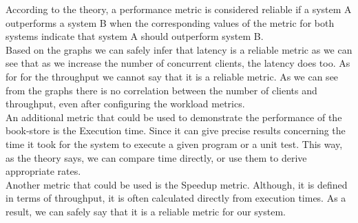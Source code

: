 \documentclass{article}      %
\begin{document}
According to the theory, a performance metric is considered reliable if a system A outperforms a system B when the corresponding values of the metric for both systems indicate that system A should outperform system B. \\

Based on the graphs we can safely infer that latency is a reliable metric as we can see that as we increase the number of concurrent clients, the latency does too. As for for the throughput we cannot say that it is a reliable metric. As we can see from the graphs there is no correlation between the number of clients and throughput, even after configuring the workload metrics. \\

An additional metric that could be used to demonstrate the performance of the book-store is the Execution time. Since it can give precise results concerning the time it took for the system to execute a given program or a unit test. This way, as the theory says, we can compare time directly, or use them to derive appropriate rates. \\

Another metric that could be used is the Speedup metric. Although, it is defined in terms of throughput, it is often calculated directly from execution times. As a result, we can safely say that it is a reliable metric for our system. \\
\end{document}
